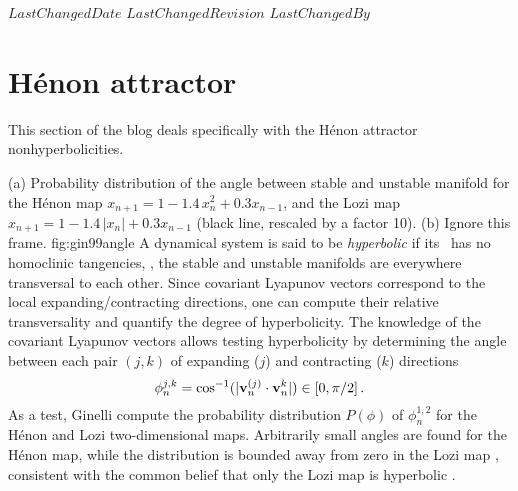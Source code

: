 \ifsvnmulti
 {$LastChangedDate$}
 {$LastChangedRevision$} {$LastChangedBy$}
\fi

\chapter{H\'enon  attractor}
\label{c-Henon}

This section of the blog deals specifically with the
H\'enon attractor nonhyperbolicities.

%
{}{
(a) Probability distribution of the angle between stable and
unstable manifold for the H\'enon map $x_{n+1} = 1 -1.4\,
x_n^2 + 0.3 x_{n-1}$, and the Lozi map $x_{n+1} = 1
-1.4\,|x_n| + 0.3 x_{n-1}$ (black line, rescaled by a factor
10). (b) Ignore this frame.
}{fig:gin99angle} %
%
%
A dynamical system is said to be \emph{hyperbolic} if its
\statesp\ has no homoclinic tangencies, \ie, the stable and
unstable manifolds are everywhere transversal to each other.
Since covariant Lyapunov vectors correspond to the local
expanding/contracting directions, one can compute their
relative transversality and quantify the degree of hyperbolicity.
The knowledge of the covariant Lyapunov vectors allows testing hyperbolicity by
determining the angle between each pair $(j,k)$ of expanding
($j$) and contracting ($k$) directions
\[
\phi_n^{j,k} = \cos^{-1}(|{\bf v}_n^{(j)} \cdot{\bf v}_n^k|) \in [0,\pi/2]
\,.
\]
As a test, Ginelli \etal{} compute the
probability distribution $P(\phi)$ of $\phi_n^{1,2}$ for the
H\'enon and Lozi two-dimensional maps. Arbitrarily small
angles are found for the H\'enon map, while the distribution
is bounded away from zero in the Lozi map ,
consistent with the common belief that
only the Lozi map is hyperbolic .

